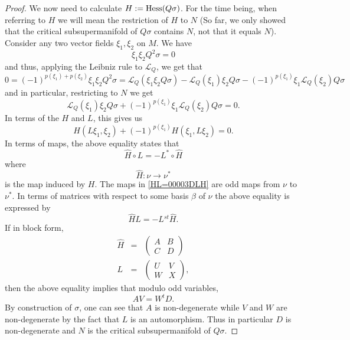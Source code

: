\documentclass[11pt]{amsart}
\numberwithin{equation}{section}
\numberwithin{figure}{section}
\theoremstyle{plain}
\theoremstyle{definition}
\theoremstyle{remark}
\begin{document}
\begin{proof}
We now need to calculate $H:=\mathrm{Hess}(Q\sigma)$. For the time being,
when referring to $H$ we will mean the restriction of $H$ to $N$
(So far, we only showed that the critical subsupermanifold of $Q\sigma$
contains $N$, not that it equals $N$). Consider any two vector fields
$\xi_{1},\xi_{2}$ on $M$. We have 
\[
\xi_{1}\xi_{2}Q^{2}\sigma=0
\]
and thus, applying the Leibniz rule to $\mathcal{L}_{Q}$, we get
that 
\[
0=\left(-1\right)^{p(\xi_{1})+p(\xi_{2})}\xi_{1}\xi_{2}Q^{2}\sigma=\mathcal{L}_{Q}\left(\xi_{1}\xi_{2}Q\sigma\right)-\mathcal{L}_{Q}(\xi_{1})\xi_{2}Q\sigma-(-1)^{p(\xi_{1})}\xi_{1}\mathcal{L}_{Q}\left(\xi_{2}\right)Q\sigma
\]
and in particular, restricting to $N$ we get 
\[
\mathcal{L}_{Q}(\xi_{1})\xi_{2}Q\sigma+(-1)^{p(\xi_{1})}\xi_{1}\mathcal{L}_{Q}(\xi_{2})Q\sigma=0.
\]
In terms of the $H$ and $L$, this gives us 
\[
H(L\xi_{1},\xi_{2})+(-1)^{p(\xi_{1})}H(\xi_{1},L\xi_{2})=0.
\]
In terms of maps, the above equality states that 
\begin{equation}
\hat{H}\circ L=-L^{*}\circ\hat{H}\label{eq:HL=00003DLH}
\end{equation}
where 
\[
\hat{H}:\nu\rightarrow\nu^{*}
\]
is the map induced by $H$. The maps in \eqref{HL=00003DLH} are odd
maps from $\nu$ to $\nu^{*}$. In terms of matrices with respect
to some basis $\beta$ of $\nu$ the above equality is expressed by
\begin{equation}
\hat{H}L=-L{}^{st}\hat{H}.\label{eq:HL=00003DLHMatrices}
\end{equation}
If in block form, 
\begin{eqnarray*}
\hat{H} & = & \left(\begin{matrix}A & B\\
C & D
\end{matrix}\right)\\
L & = & \left(\begin{matrix}U & V\\
W & X
\end{matrix}\right),
\end{eqnarray*}
then the above equality implies that modulo odd variables, 
\begin{equation}
AV=W^{t}D.\label{eq:AV=00003DWD}
\end{equation}
By construction of $\sigma$, one can see that $A$ is non-degenerate
while $V$ and $W$ are non-degenerate by the fact that $L$ is an
automorphism. Thus in particular $D$ is non-degenerate and $N$ is
the critical subsupermanifold of $Q\sigma$. 


\end{proof}
\end{document}
